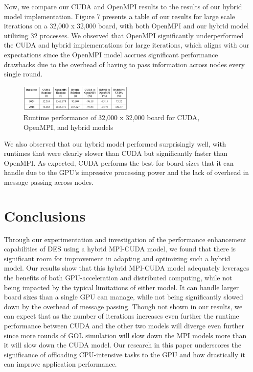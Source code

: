 \documentclass[11pt,twocolumn]{article}
\begin{document}
Now, we compare our CUDA and OpenMPI results to the results of our hybrid model implementation. Figure 7 presents a table of our results for large scale iterations on a 32,000 x 32,000 board, with both OpenMPI and our hybrid model utilizing 32 processes. We observed that OpenMPI significantly underperformed the CUDA and hybrid implementations for large iterations, which aligns with our expectations since the OpenMPI model accrues significant performance drawbacks due to the overhead of having to pass information across nodes every single round.
\begin{figure}[!htbp]
    \centering
    \includegraphics[width=0.5\textwidth]{CompAnalysis.png}
    \caption{Runtime performance of 32,000 x 32,000 board for CUDA, OpenMPI, and hybrid models}
    \label{fig:CompAnalysis}
\end{figure}

We also observed that our hybrid model performed surprisingly well, with runtimes that were clearly slower than CUDA but significantly faster than OpenMPI. As expected, CUDA performs the best for board sizes that it can handle due to the GPU's impressive processing power and the lack of overhead in message passing across nodes. 

\section{Conclusions}
Through our experimentation and investigation of the performance enhancement capabilities of DES using a hybrid MPI-CUDA model, we found that there is significant room for improvement in adapting and optimizing such a hybrid model. Our results show that this hybrid MPI-CUDA model adequately leverages the benefits of both GPU-acceleration and distributed computing, while not being impacted by the typical limitations of either model. It can handle larger board sizes than a single GPU can manage, while not being significantly slowed down by the overhead of message passing. Though not shown in our results, we can expect that as the number of iterations increases even further the runtime performance between CUDA and the other two models will diverge even further since more rounds of GOL simulation will slow down the MPI models more than it will slow down the CUDA model. Our research in this paper underscores the significance of offloading CPU-intensive tasks to the GPU and how drastically it can improve application performance. 
\end{document}
